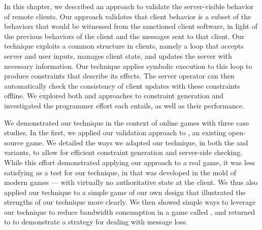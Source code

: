 In this chapter, we described an approach to validate the server-visible
behavior of remote clients.  Our approach validates that client
behavior is a subset of the behaviors that would be witnessed from the
sanctioned client software, in light of the previous behaviors of the
client and the messages sent to that client.  Our technique exploits
a common structure in clients, namely a loop that accepts server
and user inputs, manages client state, and updates the server with
necessary information.  Our technique
applies symbolic execution to this loop to produce constraints that
describe its effects.  The server operator can then automatically check
the consistency of client updates with these constraints offline.  We
explored both \lazy and \eager approaches to constraint generation and
investigated the programmer effort each entails, as well as their
performance.

We demonstrated our technique in the context of online games with 
three case studies.
In the first, we applied our validation approach to \xpilot, an
existing open-source game.  We detailed the ways we adapted our
technique, in both the \lazy and \eager variants, to allow for
efficient constraint generation and server-side checking.  While this
effort demonstrated applying our approach to a real game, it was less
satisfying as a test for our technique, in that \xpilot was developed
in the mold of modern games --- with virtually no authoritative state
at the client.  We thus also applied our technique to a simple game of
our own design that illustrated the strengths of our technique more
clearly.  We then showed simple ways to leverage our technique to
reduce bandwidth consumption in a game called \tetrinet, and returned
to \xpilot to demonstrate a strategy for dealing with message loss.




